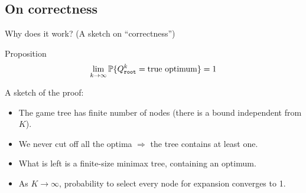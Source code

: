 \documentclass[10pt, xcolor=svgnames]{beamer}
\begin{document}
\subsection{On correctness}
\label{sec:orgc52db11}
\begin{frame}[label={sec:org4605e31}]{Why does it work? (A sketch on ``correctness'')}
\begin{block}{Proposition}
$$\lim_{k\rightarrow \infty} \mathbb{P}\{Q^k_{\texttt{root}{}} = \textrm{true optimum}\}=1$$
\end{block}
A sketch of the proof:

\begin{itemize}
\item The game tree has finite number of nodes (there is a bound independent from \(K\)).
\item We never cut off all the optima \(\Rightarrow\) the tree contains at least one.
\item What is left is a finite-size minimax tree, containing an optimum.
\item As \(K\rightarrow\infty\), probability to select every node for expansion converges to 1.
\end{itemize}
\end{frame}
\end{document}
